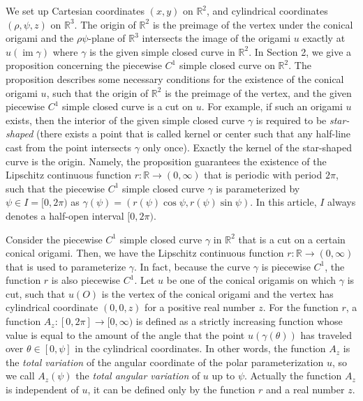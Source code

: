 \documentclass{amsart}
\theoremstyle{plain}
\theoremstyle{definition}
\theoremstyle{remark}
\DeclareMathOperator{\im}{im}
\begin{document}
We set up Cartesian coordinates $(x,y)$ on $\mathbb{R}^2$, and cylindrical coordinates $(\rho,\psi,z)$ on $\mathbb{R}^3$.
The origin of $\mathbb{R}^2$ is the preimage of the vertex under the conical origami and the $\rho\psi$-plane of $\mathbb{R}^3$ intersects the image of the origami $u$ exactly at $u(\im\gamma)$ where $\gamma$ is the given simple closed curve in $\mathbb{R}^2$.
In Section 2, we give a proposition concerning the piecewise $C^1$ simple closed curve on $\mathbb{R}^2$.
The proposition describes some necessary conditions for the existence of the conical origami $u$, such that the origin of $\mathbb{R}^2$ is the preimage of the vertex, and the given piecewise $C^1$ simple closed curve is a cut on $u$.
For example, if such an origami $u$ exists, then the interior of the given simple closed curve $\gamma$ is required to be \emph{star-shaped} (there exists a point that is called kernel or center such that any half-line cast from the point intersects $\gamma$ only once).
Exactly the kernel of the star-shaped curve is the origin.
Namely, the proposition guarantees the existence of the Lipschitz continuous function $r:\mathbb{R}\to(0,\infty)$ that is periodic with period $2\pi$, such that the piecewise $C^1$ simple closed curve $\gamma$ is parameterized by $\psi\in I=[0,2\pi)$ as $\gamma(\psi)=(r(\psi)\cos\psi,r(\psi)\sin\psi)$.
In this article, $I$ always denotes a half-open interval $[0,2\pi)$.

Consider the piecewise $C^1$ simple closed curve $\gamma$ in $\mathbb{R}^2$ that is a cut on a certain conical origami.
Then, we have the Lipschitz continuous function $r:\mathbb{R}\to(0,\infty)$ that is used to parameterize $\gamma$.
In fact, because the curve $\gamma$ is piecewise $C^1$, the function $r$ is also piecewise $C^1$.
Let $u$ be one of the conical origamis on which $\gamma$ is cut, such that $u(O)$ is the vertex of the conical origami and the vertex has cylindrical coordinate $(0,0,z)$ for a positive real number $z$.
For the function $r$, a function $A_z:[0,2\pi]\to[0,\infty)$ is defined as a strictly increasing function whose value is equal to the amount of the angle that the point $u(\gamma(\theta))$ has traveled over $\theta\in[0,\psi]$ in the cylindrical coordinates.
In other words, the function $A_z$ is the \emph{total variation} of the angular coordinate of the polar parameterization $u$, so we call $A_z(\psi)$ the \emph{total angular variation} of $u$ up to $\psi$.
Actually the function $A_z$ is independent of $u$, it can be defined only by the function $r$ and a real number $z$.
\end{document}

